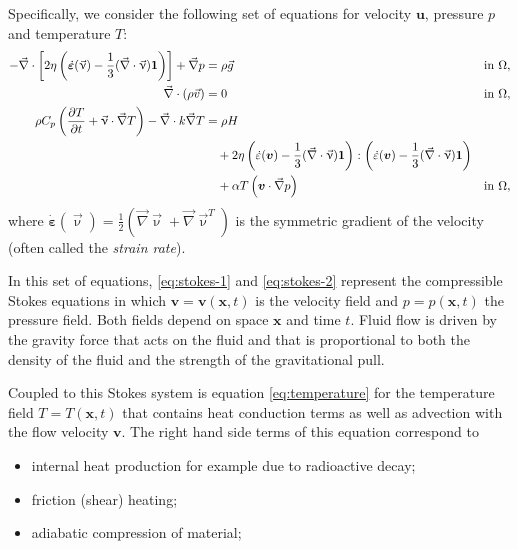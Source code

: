 Specifically, we consider the following set of equations for velocity $\mathbf
u$, pressure $p$ and temperature $T$:
\begin{align}
  \label{eq:stokes-1}
  -\vec\nabla \cdot \left[2\eta \left(\dot{\bm \varepsilon}(\vec \upnu)
                                  - \frac{1}{3}(\vec\nabla \cdot \vec \upnu)\mathbf 1\right)
                \right] + \vec\nabla p &=
  \rho \vec g
  &
  & \textrm{in $\Omega$},
  \\
  \label{eq:stokes-2}
  \vec\nabla \cdot (\rho \vec v) &= 0
  &
  & \textrm{in $\Omega$},
  \\
  \label{eq:temperature}
  \rho C_p \left(\frac{\partial T}{\partial t} + \vec \upnu\cdot\vec\nabla T\right)
  - \vec\nabla\cdot k\vec\nabla T
  &=
  \rho H
  \notag
  \\
  &\quad
  +
  2\eta
  \left(\dot\varepsilon(\bm v) - \frac{1}{3}(\vec\nabla \cdot \vec \upnu)\mathbf 1\right)
  :
  \left(\dot\varepsilon(\bm v) - \frac{1}{3}(\vec\nabla \cdot \vec \upnu)\mathbf 1\right)
  \\
  &\quad
  +\alpha T \left( \bm v \cdot \vec\nabla p \right)
  && \textrm{in $\Omega$},
  \notag
\end{align}
where $\dot{\bm \varepsilon}(\vec\upnu) = \frac{1}{2}(\vec\nabla \vec\upnu + \vec\nabla \vec\upnu^T)$ 
is the symmetric gradient of the velocity (often called the
\textit{strain rate}).

In this set of equations, \eqref{eq:stokes-1} and \eqref{eq:stokes-2}
represent the compressible Stokes equations in which $\mathbf v=\mathbf
v(\mathbf x,t)$ is the velocity field and $p=p(\mathbf x,t)$ the pressure
field. Both fields depend on space $\mathbf x$ and time $t$. Fluid flow is
driven by the gravity force that acts on the fluid and that is proportional to
both the density of the fluid and the strength of the gravitational pull.

Coupled to this Stokes system is equation \eqref{eq:temperature} for the
temperature field $T=T(\mathbf x,t)$ that contains heat conduction terms as
well as advection with the flow velocity $\mathbf v$. The right hand side
terms of this equation correspond to
\begin{itemize}
\item internal heat production for example due to radioactive decay;
\item friction (shear) heating;
\item adiabatic compression of material;
\end{itemize}

